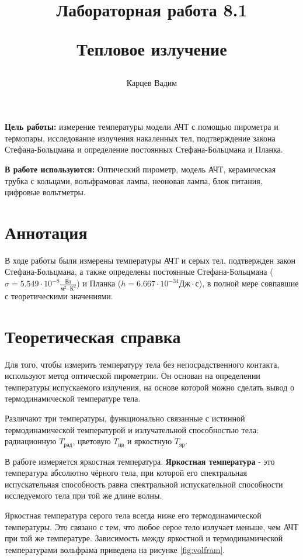 \documentclass[12pt]{article}
\author{Карцев Вадим}
\title{Лабораторная работа 8.1

Тепловое излучение}
\begin{document}
  \maketitle

  \textbf{Цель работы:} измерение температуры модели АЧТ с помощью пирометра и
  термопары, исследование излучения накаленных тел, подтверждение закона
  Стефана-Больцмана и определение постоянных Стефана-Больцмана и Планка.

  \vspace{0.3cm}

  \textbf{В работе используются:} Оптический пирометр, модель АЧТ, керамическая
  трубка с кольцами, вольфрамовая лампа, неоновая лампа, блок питания, цифровые
  вольтметры.

  \section*{Аннотация}

    В ходе работы были измерены температуры АЧТ и серых тел, подтвержден закон
    Стефана-Больцмана, а также определены постоянные Стефана-Больцмана
    ($\sigma = 5.549 \cdot 10^{-8} \frac{Вт}{м^2 \cdot К^2}$) и Планка
    ($h = 6.667 \cdot 10^{-34} Дж \cdot с$), в полной мере совпавшие с
    теоретическими значениями.

  \tableofcontents

  \newpage
  \section{Теоретическая справка}

    Для того, чтобы измерить температуру тела без непосрадственного контакта,
    используют метод оптической пирометрии. Он основан на определении температуры
    испускаемого излучения, на основе которой можно сделать вывод о
    термодинамической температуре тела.

    Различают три температуры, функционально связанные с истинной
    термодинамической температурой и излучательной способностью тела:
    радиационную $T_{рад}$, цветовую $T_{цв}$ и яркостную $T_{яр}$.

    В работе измеряется яркостная температура. \textbf{Яркостная температура} -
    это температура абсолютно чёрного тела, при которой его спектральная
    испускательная способность равна спектральной испускательной способности
    исследуемого тела при той же длине волны.

    Яркостная температура серого тела всегда ниже его термодинамической температуры.
    Это связано с тем, что любое серое тело излучает меньше, чем АЧТ при той
    же температуре. Зависимость между яркостной и термодинамической
    температурами вольфрама приведена на рисунке \ref{fig:volfram}.
\end{document}
